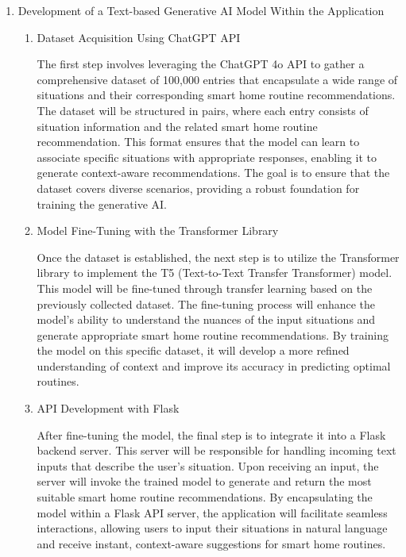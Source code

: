 \documentclass[conference]{IEEEtran}
\begin{document}
\begin{enumerate}[label=\arabic*]
    \item Development of a Text-based Generative AI Model Within the Application\par
    \vspace{0.3em}

    \begin{enumerate}[label=\arabic*)] 
        \item Dataset Acquisition Using ChatGPT API\par
        \vspace{0.3em}
        The first step involves leveraging the ChatGPT 4o API to gather a comprehensive dataset of 100,000 entries that encapsulate a wide range of situations and their corresponding smart home routine recommendations. The dataset will be structured in pairs, where each entry consists of situation information and the related smart home routine recommendation. This format ensures that the model can learn to associate specific situations with appropriate responses, enabling it to generate context-aware recommendations. The goal is to ensure that the dataset covers diverse scenarios, providing a robust foundation for training the generative AI.

        \vspace{0.5em}

        \item Model Fine-Tuning with the Transformer Library\par
        \vspace{0.3em}
        Once the dataset is established, the next step is to utilize the Transformer library to implement the T5 (Text-to-Text Transfer Transformer) model. This model will be fine-tuned through transfer learning based on the previously collected dataset. The fine-tuning process will enhance the model’s ability to understand the nuances of the input situations and generate appropriate smart home routine recommendations. By training the model on this specific dataset, it will develop a more refined understanding of context and improve its accuracy in predicting optimal routines.

        \vspace{0.5em}

        \item API Development with Flask\par
        \vspace{0.3em}
        After fine-tuning the model, the final step is to integrate it into a Flask backend server. This server will be responsible for handling incoming text inputs that describe the user’s situation. Upon receiving an input, the server will invoke the trained model to generate and return the most suitable smart home routine recommendations. By encapsulating the model within a Flask API server, the application will facilitate seamless interactions, allowing users to input their situations in natural language and receive instant, context-aware suggestions for smart home routines.  
    \end{enumerate}


\end{enumerate}
\end{document}
